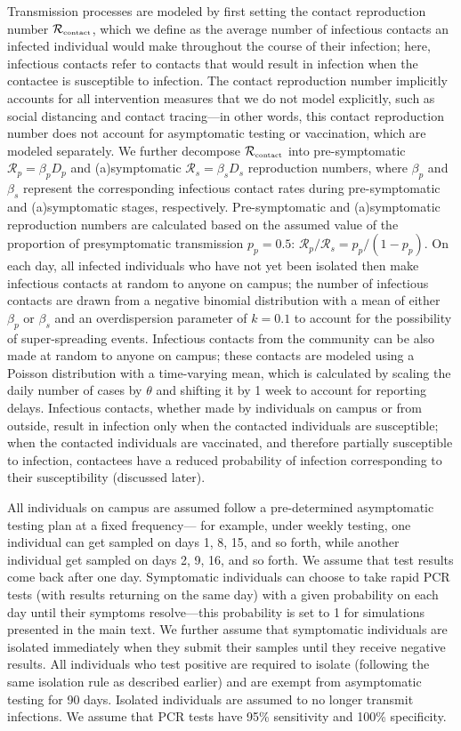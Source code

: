 \documentclass[12pt]{article}
\newcommand{\Rx}[1]{\ensuremath{{\mathcal R}_{#1}}}
\newcommand{\Rc}{\Rx{\textrm{\tiny{contact}}}}
\begin{document}
Transmission processes are modeled by first setting the contact reproduction number $\Rc$, which we define as the average number of infectious contacts an infected individual would make throughout the course of their infection;
here, infectious contacts refer to contacts that would result in infection when the contactee is susceptible to infection.
The contact reproduction number implicitly accounts for all intervention measures that we do not model explicitly, such as social distancing and contact tracing---in other words, this contact reproduction number does not account for asymptomatic testing or vaccination, which are modeled separately.
We further decompose $\Rc$ into pre-symptomatic $\mathcal R_p = \beta_p D_p$ and (a)symptomatic $\mathcal R_s = \beta_s D_s$ reproduction numbers, where $\beta_p$ and $\beta_s$ represent the corresponding infectious contact rates during pre-symptomatic and (a)symptomatic stages, respectively. Pre-symptomatic and (a)symptomatic reproduction numbers are calculated based on the assumed value of the proportion of presymptomatic transmission $p_p = 0.5$: $\mathcal R_p/\mathcal R_s = p_p/(1 - p_p)$.
On each day, all infected individuals who have not yet been isolated then make infectious contacts at random to anyone on campus; the number of infectious contacts are drawn from a negative binomial distribution with a mean of either $\beta_p$ or $\beta_s$ and an overdispersion parameter of $k=0.1$ to account for the possibility of super-spreading events.
Infectious contacts from the community can be also made at random to anyone on campus; these contacts are modeled using a Poisson distribution with a time-varying mean, which is calculated by scaling the daily number of cases by $\theta$ and shifting it by 1 week to account for reporting delays.
Infectious contacts, whether made by individuals on campus or from outside, result in infection only when the contacted individuals are susceptible; when the contacted individuals are vaccinated, and therefore partially susceptible to infection, contactees have a reduced probability of infection corresponding to their susceptibility (discussed later).

All individuals on campus are assumed follow a pre-determined asymptomatic testing plan at a fixed frequency---
for example, under weekly testing, one individual can get sampled on days 1, 8, 15, and so forth, while another individual get sampled on days 2, 9, 16, and so forth.
We assume that test results come back after one day.
Symptomatic individuals can choose to take rapid PCR tests (with results returning on the same day) with a given probability on each day until their symptoms resolve---this probability is set to 1 for simulations presented in the main text.
We further assume that symptomatic individuals are isolated immediately when they submit their samples until they receive negative results.
All individuals who test positive are required to isolate (following the same isolation rule as described earlier) and are exempt from asymptomatic testing for 90 days.
Isolated individuals are assumed to no longer transmit infections.
We assume that PCR tests have 95\% sensitivity and 100\% specificity.
\end{document}
